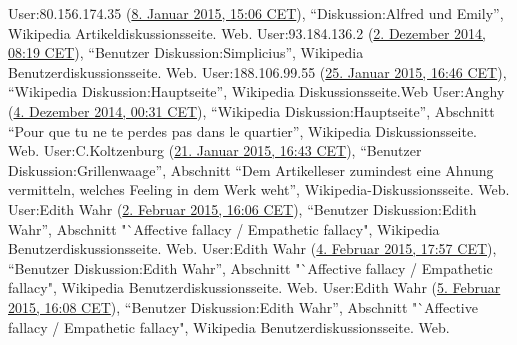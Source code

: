 \documentclass[fontsize=12pt]{scrartcl}
\begin{document}
{{{{\begin{thebibliography}
	User:80.156.174.35 (\href{https://de.wikipedia.org/w/index.php?title=Diskussion:Alfred_und_Emily\&oldid=137566068}{8. Januar 2015, 15:06 CET}), "`Diskussion:Alfred und Emily"', Wiki\-pedia Ar\-tikel\-diskus\-sions\-seite. Web. 
	User:93.184.136.2 (\href{http://de.wikipedia.org/w/index.php?title=Benutzer_Diskussion:Simplicius&diff=prev&oldid=136386468}{2. Dezember 2014, 08:19 CET}), "`Be\-nut\-zer Dis\-kus\-si\-on:Simplicius"', Wi\-ki\-pe\-dia Be\-nut\-zerdis\-kus\-si\-onsseite. Web.
User:188.106.99.55 (\href{https://de.wikipedia.org/w/index.php?title=Wikipedia_Diskussion:Hauptseite&type=revision&diff=138151607&oldid=138138024}{25. Januar 2015, 16:46 CET}), "`Wi\-ki\-pe\-dia Dis\-kus\-si\-on:Hauptseite"', Wi\-ki\-pe\-dia Dis\-kus\-si\-onsseite.Web
	User:Anghy (\href{https://de.wikipedia.org/w/index.php?title=Wikipedia_Diskussion:Hauptseite\&diff=prev\&oldid=136447261}{4. Dezember 2014, 00:31 CET}), "`Wi\-ki\-pe\-dia Dis\-kus\-si\-on:Hauptseite"', Abschnitt "`‎Pour que tu ne te perdes pas dans le quartier"', Wi\-ki\-pe\-dia Dis\-kus\-si\-onsseite. Web.
	User:C.Koltzenburg (\href{https://de.wikipedia.org/w/index.php?title=Benutzer_Diskussion:Grillenwaage\&diff=prev\&oldid=138021151}{21. Januar 2015, 16:43 CET}), "`Be\-nut\-zer Dis\-kus\-si\-on:Grillenwaage"', Abschnitt "`Dem Artikelleser zumindest eine Ahnung vermitteln, welches \flq Feeling\frq \,\,in dem Werk weht"', Wi\-ki\-pe\-dia-Dis\-kus\-si\-onsseite. Web.
	User:Edith Wahr (\href{https://de.wikipedia.org/w/index.php?title=Benutzer_Diskussion:Edith_Wahr\&diff=138421804\&oldid=138421510}{2. Februar 2015, 16:06 CET}), "`Be\-nut\-zer Dis\-kus\-si\-on:Edith Wahr"', Abschnitt "`Affective fallacy / Empathetic fallacy", Wi\-ki\-pe\-dia Be\-nut\-zer\-dis\-kus\-si\-ons\-seite. Web.
	User:Edith Wahr (\href{https://de.wikipedia.org/w/index.php?title=Benutzer_Diskussion:Edith_Wahr\&diff=prev\&oldid=138494233}{4. Februar 2015, 17:57 CET}), "`Be\-nut\-zer Dis\-kus\-si\-on:Edith Wahr"', Abschnitt "`Affective fallacy / Empathetic fallacy", Wi\-ki\-pe\-dia Be\-nut\-zer\-dis\-kus\-si\-ons\-seite. Web.
	User:Edith Wahr (\href{https://de.wikipedia.org/w/index.php?title=Benutzer_Diskussion:Edith_Wahr\&diff=next\&oldid=138508487}{5. Februar 2015, 16:08 CET}), "`Be\-nut\-zer Dis\-kus\-si\-on:Edith Wahr"', Abschnitt "`Affective fallacy / Empathetic fallacy", Wi\-ki\-pe\-dia Be\-nut\-zer\-dis\-kus\-si\-ons\-seite. Web.

\end{thebibliography}}}}}
\end{document}
